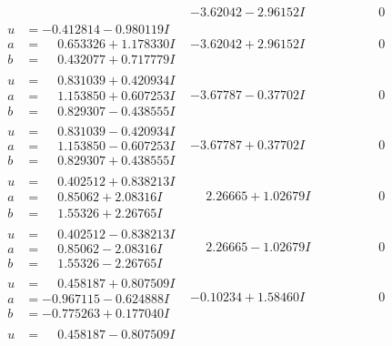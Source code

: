 \documentclass[1p]{elsarticle_modified}
\theoremstyle{definition}
\begin{document}
$$\begin{array}{c|c|c}
 & -3.62042 - 2.96152 I & \phantom{-0.000000 } 0 \\ \hline\begin{aligned}
u &= -0.412814 - 0.980119 I \\
a &= \phantom{-}0.653326 + 1.178330 I \\
b &= \phantom{-}0.432077 + 0.717779 I\end{aligned}
 & -3.62042 + 2.96152 I & \phantom{-0.000000 } 0 \\ \hline\begin{aligned}
u &= \phantom{-}0.831039 + 0.420934 I \\
a &= \phantom{-}1.153850 + 0.607253 I \\
b &= \phantom{-}0.829307 - 0.438555 I\end{aligned}
 & -3.67787 - 0.37702 I & \phantom{-0.000000 } 0 \\ \hline\begin{aligned}
u &= \phantom{-}0.831039 - 0.420934 I \\
a &= \phantom{-}1.153850 - 0.607253 I \\
b &= \phantom{-}0.829307 + 0.438555 I\end{aligned}
 & -3.67787 + 0.37702 I & \phantom{-0.000000 } 0 \\ \hline\begin{aligned}
u &= \phantom{-}0.402512 + 0.838213 I \\
a &= \phantom{-}0.85062 + 2.08316 I \\
b &= \phantom{-}1.55326 + 2.26765 I\end{aligned}
 & \phantom{-}2.26665 + 1.02679 I & \phantom{-0.000000 } 0 \\ \hline\begin{aligned}
u &= \phantom{-}0.402512 - 0.838213 I \\
a &= \phantom{-}0.85062 - 2.08316 I \\
b &= \phantom{-}1.55326 - 2.26765 I\end{aligned}
 & \phantom{-}2.26665 - 1.02679 I & \phantom{-0.000000 } 0 \\ \hline\begin{aligned}
u &= \phantom{-}0.458187 + 0.807509 I \\
a &= -0.967115 - 0.624888 I \\
b &= -0.775263 + 0.177040 I\end{aligned}
 & -0.10234 + 1.58460 I & \phantom{-0.000000 } 0 \\ \hline\begin{aligned}
u &= \phantom{-}0.458187 - 0.807509 I \\

\end{aligned}
\end{array}$$
\end{document}
